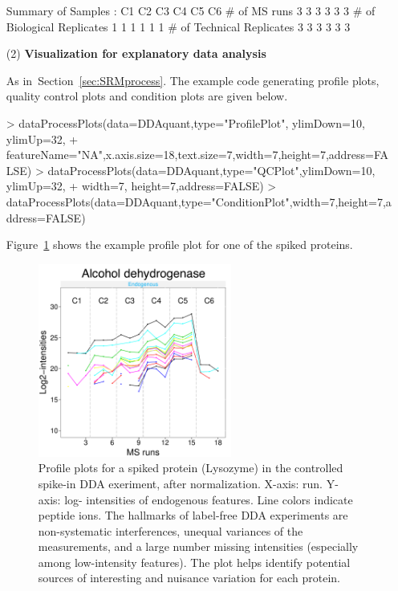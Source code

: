 \documentclass[11pt]{article}
\def\figref#1{Figure~\ref{fig:#1}}
\def\secref#1{Section~\ref{sec:#1}}
\begin{document}
\begin{enumerate}
\begin{small}
\begin{Schunk}
\begin{Soutput}
  Summary of Samples :
                           C1 C2 C3 C4 C5 C6
# of MS runs                3  3  3  3  3  3
# of Biological Replicates  1  1  1  1  1  1
# of Technical Replicates   3  3  3  3  3  3
\end{Soutput}
\end{Schunk}
\end{small}


\item[(2)]{\bf Visualization for explanatory data analysis }

As in~\secref{SRMprocess}. The example code generating profile plots, quality control plots and condition plots are given below.

\vspace{-0.1cm}
\begin{small}
\begin{Schunk}
\begin{Sinput}
> dataProcessPlots(data=DDAquant,type="ProfilePlot", ylimDown=10, ylimUp=32,
+                  featureName="NA",x.axis.size=18,text.size=7,width=7,height=7,address=FALSE)                 
> dataProcessPlots(data=DDAquant,type="QCPlot",ylimDown=10, ylimUp=32,
+                  width=7, height=7,address=FALSE)
> dataProcessPlots(data=DDAquant,type="ConditionPlot",width=7,height=7,address=FALSE)
\end{Sinput}
\end{Schunk}

\end{small}

\figref{profileLCMS} shows the example profile plot for one of the spiked proteins.
\begin{figure}[h!]
\begin{center}
\includegraphics[width=2.5in]{LCMS_ProfilePlot.pdf}
\vspace{-0.3cm}
\caption{\small Profile plots for a spiked protein (Lysozyme) in the controlled spike-in DDA exeriment, after normalization. X-axis: run. Y-axis: log- intensities of endogenous features.  Line colors indicate peptide ions. The hallmarks of label-free DDA experiments are non-systematic interferences, unequal variances of the measurements, and a large number missing intensities (especially among low-intensity features). The plot helps identify potential sources of interesting and nuisance variation for each protein. \label{fig:profileLCMS}}
\end{center}
\end{figure}

\end{enumerate}
\end{document}
